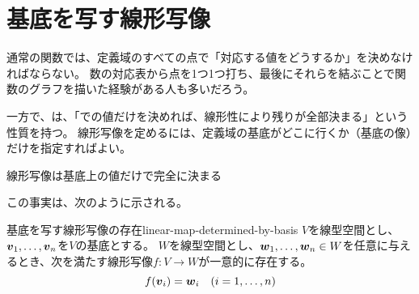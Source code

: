 \documentclass[../../../topic_linear-algebra]{subfiles}
\begin{document}
\sectionline
\section{基底を写す線形写像}

通常の関数では、定義域のすべての点で「対応する値をどうするか」を決めなければならない。
数の対応表から点を1つ1つ打ち、最後にそれらを結ぶことで関数のグラフを描いた経験がある人も多いだろう。

\br

一方で、は、「での値だけを決めれば、線形性により残りが全部決まる」という性質を持つ。
線形写像を定めるには、定義域の基底がどこに行くか（基底の像）だけを指定すればよい。

\begin{emphabox}
  \begin{spacebox}
    \begin{center}
      線形写像は基底上の値だけで完全に決まる
    \end{center}
  \end{spacebox}
\end{emphabox}

この事実は、次のように示される。

\begin{theorem}{基底を写す線形写像の存在}{linear-map-determined-by-basis}
  $V$を線型空間とし、$\vb*{v}_1, \ldots, \vb*{v}_n$を$V$の基底とする。
  $W$を線型空間とし、$\vb*{w}_1, \ldots, \vb*{w}_n \in W$を任意に与えるとき、次を満たす線形写像$f\colon V \to W$が一意的に存在する。
  \begin{equation*}
    f(\vb*{v}_i) = \vb*{w}_i \quad (i = 1, \ldots, n)
  \end{equation*}
\end{theorem}
\end{document}
